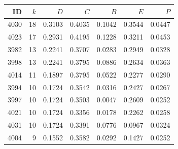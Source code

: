 \begin{tabular}{rrrrrrr}
\toprule
ID & $k$ & $D$ & $C$ & $B$ & $E$ & $P$ \\
\midrule
4030 & 18 & 0.3103 & 0.4035 & 0.1042 & 0.3544 & 0.0447 \\
4023 & 17 & 0.2931 & 0.4195 & 0.1228 & 0.3211 & 0.0453 \\
3982 & 13 & 0.2241 & 0.3707 & 0.0283 & 0.2949 & 0.0328 \\
3998 & 13 & 0.2241 & 0.3795 & 0.0886 & 0.2634 & 0.0363 \\
4014 & 11 & 0.1897 & 0.3795 & 0.0522 & 0.2277 & 0.0290 \\
3994 & 10 & 0.1724 & 0.3542 & 0.0316 & 0.2427 & 0.0267 \\
3997 & 10 & 0.1724 & 0.3503 & 0.0047 & 0.2609 & 0.0252 \\
4021 & 10 & 0.1724 & 0.3356 & 0.0178 & 0.2262 & 0.0258 \\
4031 & 10 & 0.1724 & 0.3391 & 0.0776 & 0.0967 & 0.0324 \\
4004 & 9 & 0.1552 & 0.3582 & 0.0292 & 0.1427 & 0.0252 \\
\bottomrule
\end{tabular}

